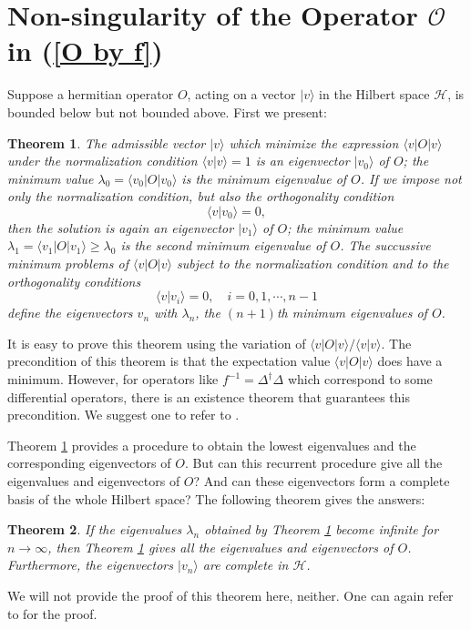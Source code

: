 \documentclass[a4paper,a4paper]{article}
\begin{document}
\section{Non-singularity of the Operator $\mathcal{O}$ in (\ref{O by f})}
\label{append}
\newtheorem{theorem}{Theorem}
\newtheorem{propo}{Proposition}

Suppose a hermitian operator $O$, acting on a vector $|v\rangle$
in the Hilbert space $\mathcal{H}$, is bounded below but not
bounded above. First we present:
\begin{theorem}\label{min}
The admissible vector $|v\rangle$ which minimize the expression
$\langle v|O|v\rangle$ under the normalization condition $\langle
v|v\rangle=1$ is an eigenvector $|v_0\rangle$ of $O$; the minimum
value $\lambda_0=\langle v_0|O|v_0\rangle$ is the minimum
eigenvalue of $O$. If we impose not only the normalization
condition, but also the orthogonality condition
\begin{equation}
\langle v|v_0\rangle=0,
\end{equation}
then the solution is again an eigenvector $|v_1\rangle$ of $O$;
the minimum value $\lambda_1=\langle
v_1|O|v_1\rangle\geq\lambda_0$ is the second minimum eigenvalue of
$O$. The succussive minimum problems of $\langle v|O|v\rangle$
subject to the normalization condition and to the orthogonality
conditions
\begin{equation}
\langle v|v_i\rangle=0,\quad i=0,1,\cdots,n-1
\end{equation}
define the eigenvectors $v_n$ with $\lambda_n$, the $(n+1)$th
minimum eigenvalues of $O$.
\end{theorem}
It is easy to prove this theorem using the variation of $\langle
v|O|v\rangle/\langle v|v\rangle$. The precondition of this theorem
is that the expectation value $\langle v|O|v\rangle$ does have a
minimum. However, for operators like $f^{-1}=\Delta^\dag\Delta$
which correspond to some differential operators, there is an
existence theorem that guarantees this precondition. We suggest
one to refer to \cite{Hilbert}.

Theorem \ref{min} provides a procedure to obtain the lowest
eigenvalues and the corresponding eigenvectors of $O$. But can
this recurrent procedure give all the eigenvalues and eigenvectors
of $O$? And can these eigenvectors form a complete basis of the
whole Hilbert space? The following theorem gives the answers:
\begin{theorem}\label{inf}
If the eigenvalues $\lambda_n$ obtained by Theorem \ref{min}
become infinite for $n\rightarrow\infty$, then Theorem \ref{min}
gives all the eigenvalues and eigenvectors of $O$. Furthermore,
the eigenvectors $|v_n\rangle$ are complete in $\mathcal{H}$.
\end{theorem}
We will not provide the proof of this theorem here, neither. One
can again refer to \cite{Hilbert} for the proof.
\end{document}
